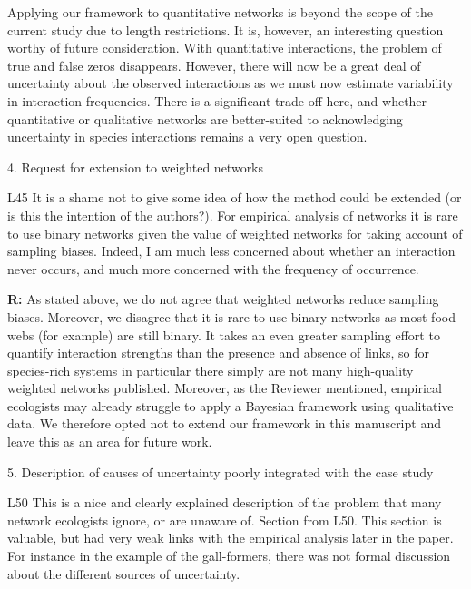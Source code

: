 \documentclass[12pt]{letter}
\newenvironment{refquote}{\bigskip \begin{it}}{\end{it}\smallskip}
\begin{document}
		Applying our framework to quantitative networks is beyond the scope of the current study due to length restrictions. It is, however, an interesting question worthy of future consideration. With quantitative interactions, the problem of true and false zeros disappears. However, there will now be a great deal of uncertainty about the observed interactions as we must now estimate variability in interaction frequencies. There is a significant trade-off here, and whether quantitative or qualitative networks are better-suited to acknowledging uncertainty in species interactions remains a very open question.


	4. Request for extension to weighted networks


		\begin{refquote}
		L45 It is a shame not to give some idea of how the method could be extended (or is this the intention of the authors?). For empirical analysis of networks it is rare to use binary networks given the value of weighted networks for taking account of sampling biases. Indeed, I am much less concerned about whether an interaction never occurs, and much more concerned with the frequency of occurrence.
		\end{refquote}


		\textbf{R:} As stated above, we do not agree that weighted networks reduce sampling biases. Moreover, we disagree that it is rare to use binary networks as most food webs (for example) are still binary. It takes an even greater sampling effort to quantify interaction strengths than the presence and absence of links, so for species-rich systems in particular there simply are not many high-quality weighted networks published. Moreover, as the Reviewer mentioned, empirical ecologists may already struggle to apply a Bayesian framework using qualitative data. We therefore opted not to extend our framework in this manuscript and leave this as an area for future work.


	5. Description of causes of uncertainty poorly integrated with the case study


		\begin{refquote}
		L50 This is a nice and clearly explained description of the problem that many network ecologists ignore, or are unaware of.
		Section from L50. This section is valuable, but had very weak links with the empirical analysis later in the paper. For instance in the example of the gall-formers, there was not formal discussion about the different sources of uncertainty. 
		\end{refquote}
\end{document}
